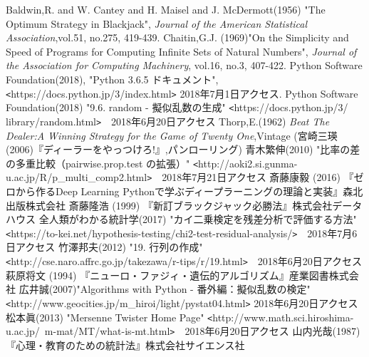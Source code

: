 \begin{thebibliography}{9}
   Baldwin,R. and W. Cantey and H. Maisel and J. McDermott(1956) "The Optimum Strategy in Blackjack", {\it{Journal of the American Statistical Association}},vol.51, no.275, 419-439.
   Chaitin,G.J. (1969)"On the Simplicity and Speed of Programs for Computing Infinite Sets of Natural Numbers", {\it{Journal of the Association for Computing Machinery}}, vol.16, no.3, 407-422.
   Python Software Foundation(2018), "Python 3.6.5 ドキュメント", \verb|<|https://docs.python.jp/3/index.html\verb|>| 2018年7月1日アクセス.
   Python Software Foundation(2018) "9.6. random - 擬似乱数の生成" \verb|<|https://docs.python.jp/3/ library/random.html\verb|>|　2018年6月20日アクセス
   Thorp,E.(1962) {\it{Beat The Dealer:A Winning Strategy for the Game of Twenty One}},Vintage (宮崎三瑛(2006)『ディーラーをやっつけろ!』,パンローリング)
   青木繁伸(2010) "比率の差の多重比較（pairwise.prop.test の拡張）" \verb|<|http://aoki2.si.gunma-u.ac.jp/R/p\_multi\_comp2.html\verb|>|　2018年7月21日アクセス
   斎藤康毅 (2016) 『ゼロから作るDeep Learning Pythonで学ぶディープラーニングの理論と実装』森北出版株式会社
   斎藤隆浩 (1999) 『新訂ブラックジャック必勝法』株式会社データハウス
   全人類がわかる統計学(2017) "カイ二乗検定を残差分析で評価する方法" \verb|<|https://to-kei.net/hypothesis-testing/chi2-test-residual-analysis/\verb|>|　2018年7月6日アクセス
   竹澤邦夫(2012) "19. 行列の作成" \verb|<|http://cse.naro.affrc.go.jp/takezawa/r-tips/r/19.html\verb|>|　2018年6月20日アクセス
   萩原将文 (1994) 『ニューロ・ファジィ・遺伝的アルゴリズム』産業図書株式会社
  広井誠(2007)"Algorithms with Python - 番外編：擬似乱数の検定" \verb|<|http://www.geocities.jp/m\_hiroi/light/pystat04.html\verb|>| 2018年6月20日アクセス
   松本眞(2013) "Mersenne Twister Home Page" \verb|<|http://www.math.sci.hiroshima-u.ac.jp/~m-mat/MT/what-is-mt.html\verb|>|　2018年6月20日アクセス
   山内光哉(1987) 『心理・教育のための統計法』株式会社サイエンス社
\end{thebibliography}
